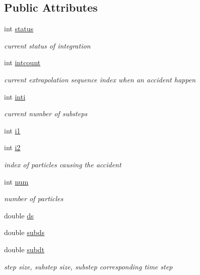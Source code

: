 \subsection*{Public Attributes}
\begin{DoxyCompactItemize}
\item 
int \hyperlink{classARC_1_1chaininfo_a64ae72bf5fd209d92b95393826f2a358}{status}
\begin{DoxyCompactList}\small\item\em current status of integration \end{DoxyCompactList}\item 
int \hyperlink{classARC_1_1chaininfo_a0bd3d3a4b97bba8fa1baea9f077f30a7}{intcount}
\begin{DoxyCompactList}\small\item\em current extrapolation sequence index when an accident happen \end{DoxyCompactList}\item 
int \hyperlink{classARC_1_1chaininfo_ab043612acf18c1c850737f67bcb6e141}{inti}
\begin{DoxyCompactList}\small\item\em current number of substeps \end{DoxyCompactList}\item 
int \hyperlink{classARC_1_1chaininfo_a50deb77aefe8f664d65f7320098d4726}{i1}
\item 
int \hyperlink{classARC_1_1chaininfo_a60f94a1f01c83934ad975f5d82638ef1}{i2}
\begin{DoxyCompactList}\small\item\em index of particles causing the accident \end{DoxyCompactList}\item 
int \hyperlink{classARC_1_1chaininfo_a4c85d251b74ed69a458e1b33b9f1173c}{num}
\begin{DoxyCompactList}\small\item\em number of particles \end{DoxyCompactList}\item 
double \hyperlink{classARC_1_1chaininfo_af689a2456268b30374ae6046704511f0}{ds}
\item 
double \hyperlink{classARC_1_1chaininfo_a3185aadb946f5d958016a35f40d0341f}{subds}
\item 
double \hyperlink{classARC_1_1chaininfo_a470e18cf65e805ff41ea3098da9cdd10}{subdt}
\begin{DoxyCompactList}\small\item\em step size, substep size, substep corresponding time step \end{DoxyCompactList}\item 

\end{DoxyCompactItemize}
